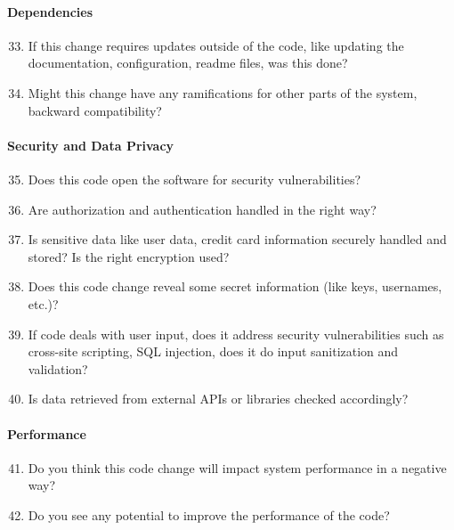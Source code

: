 \paragraph{Dependencies} 
\begin{enumerate}
 \setcounter{enumi}{32}
  \item If this change requires updates outside of the code, like updating the documentation, configuration, readme files, was this done?
  \item Might this change have any ramifications for other parts of the system, backward compatibility?
\end{enumerate}

\paragraph{Security and Data Privacy}
\begin{enumerate}
 \setcounter{enumi}{34}
  \item Does this code open the software for security vulnerabilities?
  \item Are authorization and authentication handled in the right way?
  \item Is sensitive data like user data, credit card information securely handled and stored? Is the right encryption used?
  \item Does this code change reveal some secret information (like keys, usernames, etc.)?
  \item If code deals with user input, does it address security vulnerabilities such as cross-site scripting, SQL injection, does it do input sanitization and validation?
  \item Is data retrieved from external APIs or libraries checked accordingly?
\end{enumerate}

\paragraph{Performance}
\begin{enumerate}
 \setcounter{enumi}{40}
  \item Do you think this code change will impact system performance in a negative way?
  \item Do you see any potential to improve the performance of the code?
  \end{enumerate}
	
